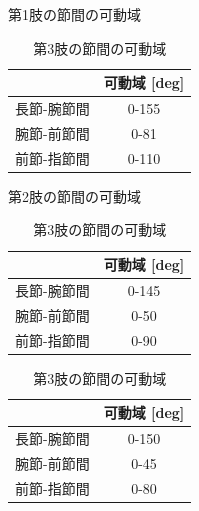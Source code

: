   \begin{table}[htbp]
  \begin{minipage}{0.5\hsize}
    \centering
    \caption{第1肢の節間の可動域}
    \label{tab:1kadou}
    \vspace{-3mm}
    \begin{tabular}{|l|c|}
    \hline
       & \multicolumn{1}{l|}{可動域 [deg]} \\ \hline
    長節-腕節間 & 0-155                         \\ \hline
    腕節-前節間 & 0-81                          \\ \hline
    前節-指節間 & 0-110                         \\ \hline
    \end{tabular}
  \end{minipage}
  \begin{minipage}{0.5\hsize}
    \centering
    \caption{第2肢の節間の可動域}
    \label{tab:2kadou}
    \vspace{-3mm}
    \begin{tabular}{|l|c|}
    \hline
       & \multicolumn{1}{l|}{可動域 [deg]} \\ \hline
    長節-腕節間 & 0-145                         \\ \hline
    腕節-前節間 & 0-50                          \\ \hline
    前節-指節間 & 0-90                          \\ \hline
    \end{tabular}
  \end{minipage}
  \begin{minipage}{0.5\hsize}
    \centering
    \vspace{5mm}
    \caption{第3肢の節間の可動域}
    \label{tab:3kadou}
    \vspace{-3mm}
    \begin{tabular}{|l|c|}
    \hline
       & \multicolumn{1}{l|}{可動域 [deg]} \\ \hline
    長節-腕節間 & 0-150                         \\ \hline
    腕節-前節間 & 0-45                          \\ \hline
    前節-指節間 & 0-80                          \\ \hline
    \end{tabular}
  \end{minipage}
\end{table}
